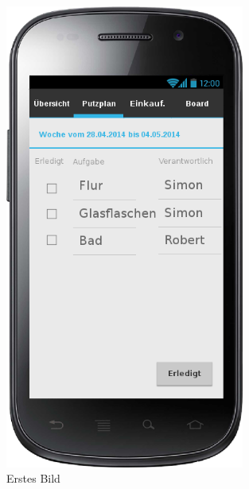 \begin{figure}[H] 
  \centering
     \includegraphics[width=0.7\textwidth]{anhang/mockups/putzplanerledigt.png}
  \caption{Erstes Bild}
  \label{fig:Bild1}
\end{figure}

